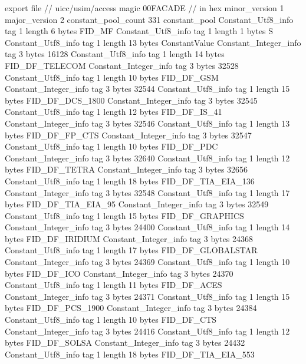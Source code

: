 export file {		// uicc/usim/access
	magic	00FACADE		 // in hex
	minor_version	1
	major_version	2
	constant_pool_count	331
	constant_pool {
		Constant_Utf8_info {
			tag	1
			length	6
			bytes	FID_MF
		}
		Constant_Utf8_info {
			tag	1
			length	1
			bytes	S
		}
		Constant_Utf8_info {
			tag	1
			length	13
			bytes	ConstantValue
		}
		Constant_Integer_info {
			tag	3
			bytes	16128
		}
		Constant_Utf8_info {
			tag	1
			length	14
			bytes	FID_DF_TELECOM
		}
		Constant_Integer_info {
			tag	3
			bytes	32528
		}
		Constant_Utf8_info {
			tag	1
			length	10
			bytes	FID_DF_GSM
		}
		Constant_Integer_info {
			tag	3
			bytes	32544
		}
		Constant_Utf8_info {
			tag	1
			length	15
			bytes	FID_DF_DCS_1800
		}
		Constant_Integer_info {
			tag	3
			bytes	32545
		}
		Constant_Utf8_info {
			tag	1
			length	12
			bytes	FID_DF_IS_41
		}
		Constant_Integer_info {
			tag	3
			bytes	32546
		}
		Constant_Utf8_info {
			tag	1
			length	13
			bytes	FID_DF_FP_CTS
		}
		Constant_Integer_info {
			tag	3
			bytes	32547
		}
		Constant_Utf8_info {
			tag	1
			length	10
			bytes	FID_DF_PDC
		}
		Constant_Integer_info {
			tag	3
			bytes	32640
		}
		Constant_Utf8_info {
			tag	1
			length	12
			bytes	FID_DF_TETRA
		}
		Constant_Integer_info {
			tag	3
			bytes	32656
		}
		Constant_Utf8_info {
			tag	1
			length	18
			bytes	FID_DF_TIA_EIA_136
		}
		Constant_Integer_info {
			tag	3
			bytes	32548
		}
		Constant_Utf8_info {
			tag	1
			length	17
			bytes	FID_DF_TIA_EIA_95
		}
		Constant_Integer_info {
			tag	3
			bytes	32549
		}
		Constant_Utf8_info {
			tag	1
			length	15
			bytes	FID_DF_GRAPHICS
		}
		Constant_Integer_info {
			tag	3
			bytes	24400
		}
		Constant_Utf8_info {
			tag	1
			length	14
			bytes	FID_DF_IRIDIUM
		}
		Constant_Integer_info {
			tag	3
			bytes	24368
		}
		Constant_Utf8_info {
			tag	1
			length	17
			bytes	FID_DF_GLOBALSTAR
		}
		Constant_Integer_info {
			tag	3
			bytes	24369
		}
		Constant_Utf8_info {
			tag	1
			length	10
			bytes	FID_DF_ICO
		}
		Constant_Integer_info {
			tag	3
			bytes	24370
		}
		Constant_Utf8_info {
			tag	1
			length	11
			bytes	FID_DF_ACES
		}
		Constant_Integer_info {
			tag	3
			bytes	24371
		}
		Constant_Utf8_info {
			tag	1
			length	15
			bytes	FID_DF_PCS_1900
		}
		Constant_Integer_info {
			tag	3
			bytes	24384
		}
		Constant_Utf8_info {
			tag	1
			length	10
			bytes	FID_DF_CTS
		}
		Constant_Integer_info {
			tag	3
			bytes	24416
		}
		Constant_Utf8_info {
			tag	1
			length	12
			bytes	FID_DF_SOLSA
		}
		Constant_Integer_info {
			tag	3
			bytes	24432
		}
		Constant_Utf8_info {
			tag	1
			length	18
			bytes	FID_DF_TIA_EIA_553
}}}
